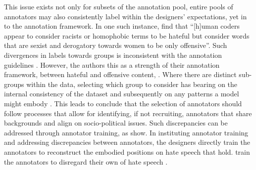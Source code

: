 This issue exists not only for subsets of the annotation pool, entire pools of annotators may also consistently label within the designers' expectations, yet in  to the annotation framework.
In one such instance, \citet{Davidson:2017} find that ``[h]uman coders appear to consider racists or homophobic terms to be hateful but consider words that are sexist and derogatory towards women to be only offensive''.
Such divergences in labels towards groups is inconsistent with the annotation guidelines . 
However, the authors  this as a strength of their annotation framework,  between hateful and offensive content, .
Where there are distinct sub-groups within the data, selecting which group to consider has bearing on the internal consistency of the dataset and subsequently on any patterns a model might embody \citep{Waseem:2016}.
This leads \citep{Waseem:2016} to conclude that the selection of annotators should follow processes that allow for identifying, if not recruiting, annotators that share backgrounds and align on socio-political issues.
Such discrepancies can  be addressed through annotator training, as \citet{Vidgen:2020} show.
In instituting annotator training and addressing discrepancies between annotators, the designers directly train the annotators to reconstruct the embodied positions on hate speech that  hold.
 train the annotators to disregard their own  of  hate speech .

